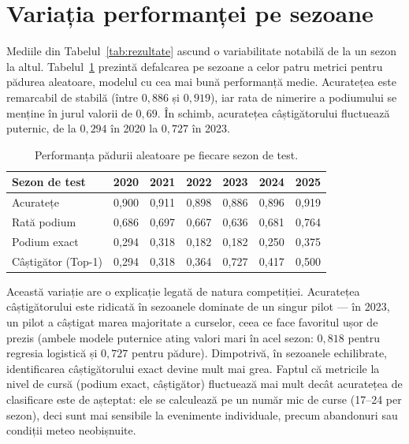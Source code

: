 \documentclass[12pt,a4paper]{report}
\begin{document}
\section{Variația performanței pe sezoane}
\label{sec:variatie}

Mediile din Tabelul~\ref{tab:rezultate} ascund o variabilitate notabilă de la un sezon la altul.
Tabelul~\ref{tab:forest_sezoane} prezintă defalcarea pe sezoane a celor patru metrici pentru
pădurea aleatoare, modelul cu cea mai bună performanță medie. Acuratețea este remarcabil de stabilă
(între $0{,}886$ și $0{,}919$), iar rata de nimerire a podiumului se menține în jurul valorii de
$0{,}69$. În schimb, acuratețea câștigătorului fluctuează puternic, de la $0{,}294$ în 2020 la
$0{,}727$ în 2023.

\begin{table}[htbp]
  \centering
  \begin{tabular}{l c c c c c c}
    \toprule
    \textbf{Sezon de test} & \textbf{2020} & \textbf{2021} & \textbf{2022} & \textbf{2023} & \textbf{2024} & \textbf{2025} \\
    \midrule
    Acuratețe          & 0,900 & 0,911 & 0,898 & 0,886 & 0,896 & 0,919 \\
    Rată podium        & 0,686 & 0,697 & 0,667 & 0,636 & 0,681 & 0,764 \\
    Podium exact       & 0,294 & 0,318 & 0,182 & 0,182 & 0,250 & 0,375 \\
    Câștigător (Top-1) & 0,294 & 0,318 & 0,364 & 0,727 & 0,417 & 0,500 \\
    \bottomrule
  \end{tabular}
  \caption{Performanța pădurii aleatoare pe fiecare sezon de test.}
  \label{tab:forest_sezoane}
\end{table}

Această variație are o explicație legată de natura competiției. Acuratețea câștigătorului este
ridicată în sezoanele dominate de un singur pilot --- în 2023, un pilot a câștigat marea majoritate
a curselor, ceea ce face favoritul ușor de prezis (ambele modele puternice ating valori mari în
acel sezon: $0{,}818$ pentru regresia logistică și $0{,}727$ pentru pădure). Dimpotrivă, în sezoanele
echilibrate, identificarea câștigătorului exact devine mult mai grea. Faptul că metricile la nivel
de cursă (podium exact, câștigător) fluctuează mai mult decât acuratețea de clasificare este de
așteptat: ele se calculează pe un număr mic de curse (17--24 per sezon), deci sunt mai sensibile la
evenimente individuale, precum abandonuri sau condiții meteo neobișnuite.
\end{document}

